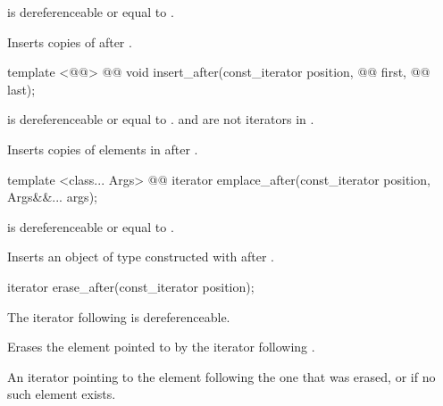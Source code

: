 \documentclass[american,twoside]{book}
\begin{document}
\begin{itemdescr}
\pnum
\requires {} is dereferenceable or equal to .

\pnum
\effects Inserts  copies of  after .
\end{itemdescr}

\begin{itemdecl}
template <@@> 
  @@
  void insert_after(const_iterator position, @@ first, @@ last);
\end{itemdecl}

\begin{itemdescr}
\pnum
\requires {} is dereferenceable or equal to .  and  are not iterators in .

\pnum
\effects Inserts copies of elements in  after .
\end{itemdescr}

\begin{itemdecl}
template <class... Args>
  @@ 
  iterator emplace_after(const_iterator position, Args&&... args);
\end{itemdecl}

\begin{itemdescr}
\pnum
\requires {} is dereferenceable or equal to .

\pnum
\effects Inserts an object of type  constructed with  after .
\end{itemdescr}

\begin{itemdecl}
iterator erase_after(const_iterator position);
\end{itemdecl}

\begin{itemdescr}
\pnum
\requires The iterator following  is dereferenceable.

\pnum
\effects Erases the element pointed to by the iterator following .

\pnum
\returns An iterator pointing to the element following the one that was erased, or  if no such element exists.
\end{itemdescr}
\end{document}
